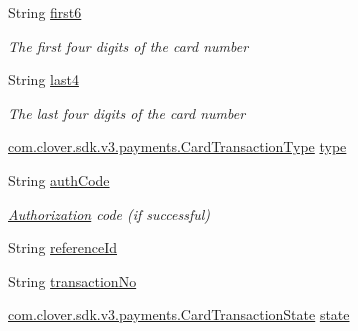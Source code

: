 \begin{DoxyCompactItemize}
\item 
String \hyperlink{classcom_1_1clover_1_1sdk_1_1v3_1_1payments_1_1_card_transaction_a5f4d24bfe33a4978b075a5998604ecd1}{first6}
\begin{DoxyCompactList}\small\item\em The first four digits of the card number \end{DoxyCompactList}\item 
String \hyperlink{classcom_1_1clover_1_1sdk_1_1v3_1_1payments_1_1_card_transaction_aa514d551dce628465819ae919a0b9d2e}{last4}
\begin{DoxyCompactList}\small\item\em The last four digits of the card number \end{DoxyCompactList}\item 
\hyperlink{namespacecom_1_1clover_1_1sdk_1_1v3_1_1payments_a4207f1c1388f6f392bd998855cc88936}{com.\+clover.\+sdk.\+v3.\+payments.\+Card\+Transaction\+Type} \hyperlink{classcom_1_1clover_1_1sdk_1_1v3_1_1payments_1_1_card_transaction_a059422417554c2eabda3ada88cb9a092}{type}
\item 
String \hyperlink{classcom_1_1clover_1_1sdk_1_1v3_1_1payments_1_1_card_transaction_a7f036a82b6ff6786391b5b36962454d3}{auth\+Code}
\begin{DoxyCompactList}\small\item\em \hyperlink{classcom_1_1clover_1_1sdk_1_1v3_1_1payments_1_1_authorization}{Authorization} code (if successful) \end{DoxyCompactList}\item 
String \hyperlink{classcom_1_1clover_1_1sdk_1_1v3_1_1payments_1_1_card_transaction_a03a40195e8a9ce4958b27ce982d2fb6f}{reference\+Id}
\item 
String \hyperlink{classcom_1_1clover_1_1sdk_1_1v3_1_1payments_1_1_card_transaction_a984d5522aebac3094e38e64f86e9312c}{transaction\+No}
\item 
\hyperlink{namespacecom_1_1clover_1_1sdk_1_1v3_1_1payments_a6f15251c00491e4f9504fe59560bcf4b}{com.\+clover.\+sdk.\+v3.\+payments.\+Card\+Transaction\+State} \hyperlink{classcom_1_1clover_1_1sdk_1_1v3_1_1payments_1_1_card_transaction_aab36d155d0fca4cb28f041727fffc9b1}{state}

\end{DoxyCompactItemize}
